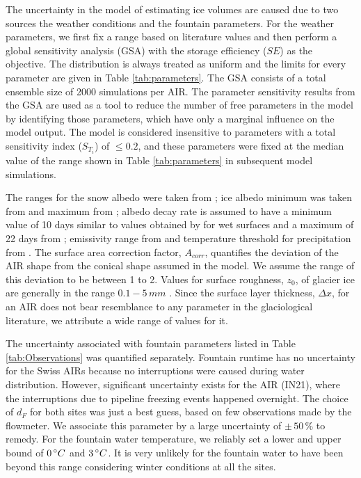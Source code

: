 \documentclass[utf8]{frontiersSCNS} %
\begin{document}
The uncertainty in the model of estimating ice volumes are caused due to two sources the weather conditions
and the fountain parameters. For the weather parameters, we first fix a range based on literature values and then perform a
global sensitivity analysis (GSA) with the storage efficiency ($SE$) as the objective. The distribution is always treated
as uniform and the limits for every parameter are given in Table \ref{tab:parameters}. The GSA consists of a total
ensemble size of 2000 simulations per AIR. The parameter sensitivity results from the GSA are used as a tool to
reduce the number of free parameters in the model by identifying those parameters, which have only a marginal
influence on the model output. The model is considered insensitive to parameters with a total sensitivity index
($S_{T_{i}}$) of $\leq 0.2$, and these parameters were fixed at the median value of the range shown in Table
\ref{tab:parameters} in subsequent model simulations.

The ranges for the snow albedo were taken from \cite{ZollesMaussion_2019}; ice albedo minimum was taken from
\cite{steiner_2015} and maximum from \cite{ZollesMaussion_2019}; albedo decay rate is assumed to have a minimum
value of 10 days similar to values obtained by \cite{Schmidt_2017} for wet surfaces and a maximum of 22 days from
\cite{OerlemansKnap_1998}; emissivity range from \cite{steiner_2015} and temperature threshold for precipitation
from \cite{Zhou_2010}. The surface area correction factor, $A_{corr}$, quantifies the deviation of the AIR shape
from the conical shape assumed in the model. We assume the range of this deviation to be between 1 to 2. Values for surface roughness, $z_{0}$, of glacier ice are generally in the range $0.1-5\, mm$
\citep{BrockWillisSharp_2006}. Since the surface layer thickness, $\Delta x$, for an AIR does not bear resemblance
to any parameter in the glaciological literature, we attribute a wide range of values for it.

The uncertainty associated with fountain parameters listed in Table \ref{tab:Observations} was quantified
separately. Fountain runtime has no uncertainty for the Swiss AIRs because no interruptions were caused during water distribution. However,
significant uncertainty exists for the AIR (IN21), where the interruptions due to pipeline freezing events happened
overnight. The choice of $d_F$ for both sites was just a best guess, based on few observations made by
the flowmeter. We associate this parameter by a large uncertainty of $\pm \,50\, \%$ to remedy. For the
fountain water temperature, we reliably set a lower and upper bound of $0\, \degree C$ and $3\, \degree C$.
It is very unlikely for the fountain water to have been beyond this range considering winter conditions at all the
sites.
\end{document}

